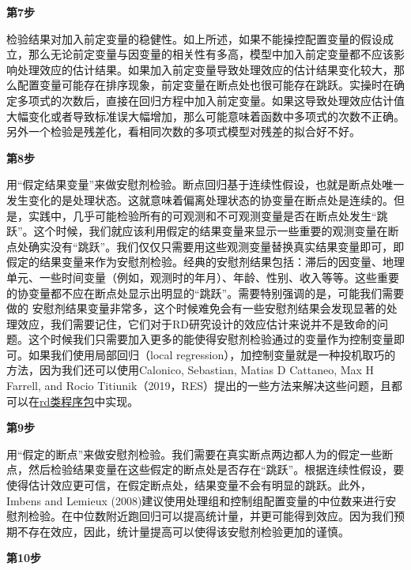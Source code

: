 \documentclass[cn,12pt,math=newtx,citestyle=gb7714-2015,bibstyle=gb7714-2015]{elegantbook}
\begin{document}
	\textbf{第7步}
	
	检验结果对加入前定变量的稳健性。如上所述，如果不能操控配置变量的假设成立，那么无论前定变量与因变量的相关性有多高，模型中加入前定变量都不应该影响处理效应的估计结果。如果加入前定变量导致处理效应的估计结果变化较大，那么配置变量可能存在排序现象，前定变量在断点处也很可能存在跳跃。实操时在确定多项式的次数后，直接在回归方程中加入前定变量。如果这导致处理效应估计值大幅变化或者导致标准误大幅增加，那么可能意味着函数中多项式的次数不正确。另外一个检验是残差化，看相同次数的多项式模型对残差的拟合好不好。
	
	\textbf{第8步}
	
	用“假定结果变量”来做安慰剂检验。断点回归基于连续性假设，也就是断点处唯一发生变化的是处理状态。这就意味着偏离处理状态的协变量在断点处是连续的。但是，实践中，几乎可能检验所有的可观测和不可观测变量是否在断点处发生“跳跃”。这个时候，我们就应该利用假定的结果变量来显示一些重要的观测变量在断点处确实没有“跳跃”。我们仅仅只需要用这些观测变量替换真实结果变量即可，即假定的结果变量来作为安慰剂检验。经典的安慰剂结果包括：滞后的因变量、地理单元、一些时间变量（例如，观测时的年月）、年龄、性别、收入等等。这些重要的协变量都不应在断点处显示出明显的“跳跃”。需要特别强调的是，可能我们需要做的 安慰剂结果变量非常多，这个时候难免会有一些安慰剂结果会发现显著的处理效应，我们需要记住，它们对于RD研究设计的效应估计来说并不是致命的问题。这个时候我们只需要加入更多的能使得安慰剂检验通过的变量作为控制变量即可。如果我们使用局部回归（local regression），加控制变量就是一种投机取巧的方法，因为我们还可以使用Calonico, Sebastian, Matias D Cattaneo, Max H Farrell, and Rocio Titiunik（2019，RES）提出的一些方法来解决这些问题，且都可以在\href{https://rdpackages.github.io/}{rd类程序包}中实现。
	
	\textbf{第9步}
	
	用“假定的断点”来做安慰剂检验。我们需要在真实断点两边都人为的假定一些断点，然后检验结果变量在这些假定的断点处是否存在“跳跃”。根据连续性假设，要使得估计效应更可信，在假定断点处，结果变量不会有明显的跳跃。此外，Imbens and Lemieux (2008)建议使用处理组和控制组配置变量的中位数来进行安慰剂检验。在中位数附近跑回归可以提高统计量，并更可能得到效应。因为我们预期不存在效应，因此，统计量提高可以使得该安慰剂检验更加的谨慎。
	
	\textbf{第10步}	
	
\end{document}
